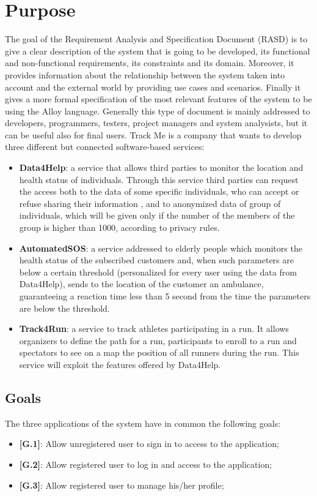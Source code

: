 \section{Purpose}
The  goal of the Requirement Analysis and Specification Document (RASD) is to give a clear description of the system that is going to be developed, its functional and non-functional requirements, its constraints and its domain. Moreover, it provides information about the relationship between the system taken into account and the external world by providing use cases and scenarios. Finally it gives a more formal specification of the most relevant features of the system to be using the Alloy language.
Generally this type of document is mainly addressed to developers, programmers, testers, project managers and system analysists, but it can be useful also for final users.
Track Me is a company that wants to develop three different but connected software-based services:
\begin{itemize}
  \item \textbf{Data4Help}: a service that allows third parties to monitor the location and health status of individuals. Through this service third parties can request the access both to the data of some specific individuals, who can accept or refuse sharing their information , and to anonymized data of group of individuals, which will be given only if the number of the members of the group is higher than 1000, according to privacy rules.
  \item \textbf{AutomatedSOS}: a service addressed to elderly people which monitors the health status of the subscribed customers and, when such parameters are below a certain threshold (personalized for every user using the data from Data4Help), sends to the location of the customer an ambulance, guaranteeing a reaction time less than 5 second from the time the parameters are below the threshold.
  \clearpage
  \item \textbf{Track4Run}: a service to track athletes participating in a run. It allows organizers to define the path for a run, participants to enroll to a run and spectators to see on a map the position of all runners during the run. This service will exploit the features offered by Data4Help.
\end{itemize}

\subsection{Goals}
The three applications of the system have in common the following goals:
\begin{itemize}
  \item \textbf{[G.1]}: Allow unregistered user to sign in to access to the application;
  \item \textbf{[G.2]}: Allow registered user to log in and access to the application;
  \item \textbf{[G.3]}: Allow registered user to manage his/her profile;
\end{itemize}

